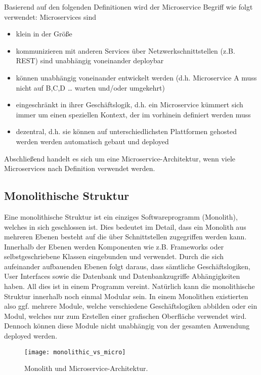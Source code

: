 Basierend auf den folgenden Definitionen wird der Microservice Begriff wie folgt verwendet: Microservices sind
\begin{itemize}
	\item klein in der Größe
	\item kommunizieren mit anderen Services über Netzwerkschnittstellen (z.B. REST) sind unabhängig voneinander deploybar
	\item können unabhängig voneinander entwickelt werden (d.h. Microservice A muss nicht auf B,C,D … warten und/oder umgekehrt)    
	\item eingeschränkt in ihrer Geschäftslogik, d.h. ein Microservice kümmert sich immer um einen speziellen Kontext, der im vorhinein definiert werden muss
	\item dezentral, d.h. sie können auf unterschiedlichsten Plattformen gehosted werden werden automatisch gebaut und deployed
\end{itemize}

Abschließend handelt es sich um eine Microservice-Architektur, wenn viele Microservices nach Definition verwendet werden. 

\subsection{Monolithische Struktur }

Eine monolithische Struktur ist ein einziges Softwareprogramm (Monolith), welches in sich geschlossen ist. Dies bedeutet im Detail, dass ein Monolith aus mehreren Ebenen besteht auf die über Schnittstellen zugegriffen werden kann. Innerhalb der Ebenen werden Komponenten wie z.B. Frameworks oder selbstgeschriebene Klassen eingebunden und verwendet.\cite{msfussell2017azure} Durch die sich aufeinander aufbauenden Ebenen folgt daraus, dass sämtliche Geschäftslogiken, User Interfaces sowie die Datenbank und Datenbankzugriffe Abhängigkeiten haben. All dies ist in einem Programm vereint.\cite{msfussell2017azure} Natürlich kann die monolithische Struktur innerhalb noch einmal Modular sein. In einem Monolithen existierten also ggf. mehrere Module, welche verschiedene Geschäftslogiken abbilden oder ein Modul, welches nur zum Erstellen einer grafischen Oberfläche verwendet wird. Dennoch können diese Module nicht unabhängig von der gesamten Anwendung deployed werden.\cite{nhiem2017mic_moving}

\begin{figure}[ht]
	\centering
	\texttt{[image: monolithic\_vs\_micro]}
	\caption{Monolith und Microservice-Architektur.\cite{msfussell2017azure}}
	\label{fig:mono}
\end{figure}

